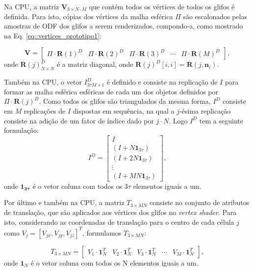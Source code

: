 \documentclass[
    12pt,                %
    oneside,            %
    a4paper,            %
    english,            %
    french,                %
    spanish,            %
    brazil                %
    ]{abntex2}
\begin{document}
Na CPU, a matriz $\mathbf{V}_{3\times N\cdot M}$ que contém todos os vértices de todos os glifos é definida. Para isto, cópias dos vértices da malha esférica $\Pi$ são escalonados pelas amostras de ODF dos glifos a serem renderizados, compondo-a, como mostrado na Eq. \ref{eq::vertices_prototipo1}:

\begin{equation}
\label{eq::vertices_prototipo1}
    \mathbf{V} = 
    \begin{bmatrix}
    \Pi\cdot\boldsymbol{R}(1)^D &
    \Pi\cdot\boldsymbol{R}(2)^D &
    \Pi\cdot\boldsymbol{R}(3)^D & \cdots &
    \Pi\cdot\boldsymbol{R}(M)^D
    \end{bmatrix}
    ,
\end{equation}
onde $\boldsymbol{R}(j)_{N\times N}^D$ é a matriz diagonal, onde $\boldsymbol{R}(j)^D[i, i] = \boldsymbol{R}(j, \mathbf{n}_i)$.%

Também na CPU, o vetor $I_{3 \tau M \times 1}^D$ é definido e consiste na replicação de $I$ para formar as malha esférica esféricas de cada um dos objetos definidos por $\Pi\cdot\boldsymbol{R}(j)^D$. Como todos os glifos são triangulados da mesma forma, $I^D$ consiste em $M$ replicações de $I$ dispostas em sequência, na qual a $j$-ésima replicação consiste na adição de um fator de índice dado por $j\cdot N$. Logo $I^D$ tem a seguinte formulação:
\begin{equation}
\label{eq::index_prototipo1}
    I^D = 
    \begin{bmatrix}
    I \\
    (I +  N\mathbf{1}_{3\tau}  ) \\
    (I + 2N\mathbf{1}_{3\tau} ) \\ \vdots \\ 
    (I + MN\mathbf{1}_{3\tau})
    \end{bmatrix}
    ,
\end{equation}
onde $\mathbf{1_{3\tau}}$ é o vetor coluna com todos os $3\tau$ elementos iguais a um.

Por último e também na CPU, a matriz $T_{3 \times MN}$ consiste no conjunto de atributos de translação, que são aplicados aos vértices dos glifos no \textit{vertex shader}. Para isto, considerando as coordenadas de translação para o centro de cada célula $j$ como $V_j = [V_{jx}, V_{jy}, V_{jz}]^T$, formulamos $T_{3 \times MN}$:

\begin{equation}
\label{eq::translation_prototipo1}
    T_{3 \times MN} =
    \begin{bmatrix}
    V_1 \cdot \mathbf{1}_N^T &
    V_2 \cdot \mathbf{1}_N^T &
    V_3 \cdot \mathbf{1}_N^T & \cdots &
    V_M \cdot \mathbf{1}_N^T
    \end{bmatrix}
,
\end{equation}
onde $\mathbf{1}_N$ é o vetor coluna com todos os N elementos iguais a um.
\end{document}
